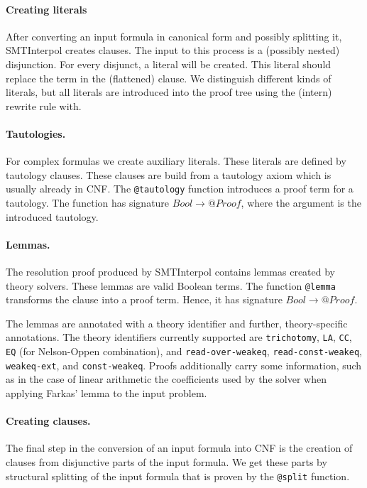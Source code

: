\documentclass[a4paper]{article}
\newcommand\si{SMTInterpol\xspace}
\begin{document}
\paragraph{Creating literals}  After converting an input formula in canonical
form and possibly splitting it, \si creates clauses.  The input to this
process is a (possibly nested) disjunction.  For every disjunct, a literal
will be created.  This literal should replace the term in the (flattened)
clause.  We distinguish different kinds of literals, but all literals are
introduced into the proof tree using the (intern) rewrite rule with.

\paragraph{Tautologies.}  For complex formulas we create auxiliary literals.
These literals are defined by tautology clauses.  These clauses are build from
a tautology axiom which is usually already in CNF.  The \verb+@tautology+
function introduces a proof term for a tautology.  The function has
signature $Bool\rightarrow @Proof$, where the argument is the introduced
tautology.

\paragraph{Lemmas.}  The resolution proof produced by \si contains lemmas
created by theory solvers.  These lemmas are valid Boolean terms.  The
function \verb+@lemma+ transforms the clause into a proof term.  Hence, it has
signature $Bool\rightarrow @Proof$.

The lemmas are annotated with a theory identifier and further,
theory-specific annotations.  The theory identifiers currently supported are
\verb+trichotomy+, \verb+LA+, \verb+CC+, \verb+EQ+ (for Nelson-Oppen combination), and
\verb+read-over-weakeq+, \verb+read-const-weakeq+, \verb+weakeq-ext+,
and \verb+const-weakeq+.  Proofs additionally carry some information, such
as in the case of linear arithmetic the coefficients used by the solver
when applying Farkas' lemma to the input
problem.

\paragraph{Creating clauses.}  The final step in the conversion of an input
formula into CNF is the creation of clauses from disjunctive parts of the
input formula.  We get these parts by structural splitting of the input
formula that is proven by the \verb+@split+ function.
\end{document}
